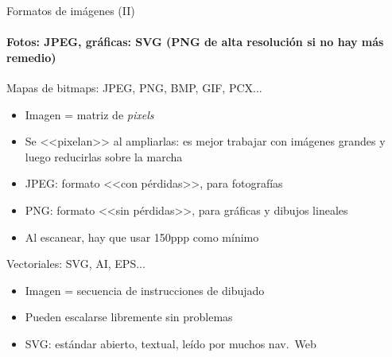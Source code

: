 \documentclass[xcolor=svgnames,compress]{beamer}
\begin{document}
\begin{frame}{Formatos de imágenes (II)}
  \framesubtitle{Fotos: JPEG, gráficas: SVG (PNG de alta resolución si no hay más remedio)}

  \begin{block}{Mapas de bitmaps: JPEG, PNG, BMP, GIF, PCX...}
    \begin{itemize}
    \item Imagen = matriz de \emph{pixels}
    \item Se <<pixelan>> al ampliarlas: es mejor trabajar con imágenes
      grandes y luego reducirlas sobre la marcha
    \item JPEG: formato <<con pérdidas>>, para fotografías
    \item PNG: formato <<sin pérdidas>>, para gráficas y dibujos
      lineales
    \item Al escanear, hay que usar 150ppp como mínimo
    \end{itemize}
  \end{block}

  \begin{block}{Vectoriales: SVG, AI, EPS...}
    \begin{itemize}
    \item Imagen = secuencia de instrucciones de dibujado
    \item Pueden escalarse libremente sin problemas
    \item SVG: estándar abierto, textual, leído por muchos nav.\ Web
    \end{itemize}
  \end{block}
\end{frame}
\end{document}
